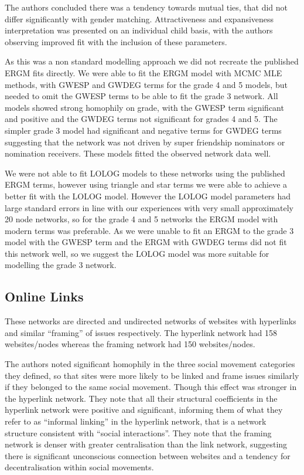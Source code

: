 \documentclass[
]{statsoc}
\begin{document}
The authors concluded there was a tendency towards mutual ties, that did
not differ significantly with gender matching. Attractiveness and
expansiveness interpretation was presented on an individual child basis,
with the authors observing improved fit with the inclusion of these
parameters.

As this was a non standard modelling approach we did not recreate the
published ERGM fits directly. We were able to fit the ERGM model with
MCMC MLE methods, with GWESP and GWDEG terms for the grade 4 and 5
models, but needed to omit the GWESP terms to be able to fit the grade 3
network. All models showed strong homophily on grade, with the GWESP
term significant and positive and the GWDEG terms not significant for
grades 4 and 5. The simpler grade 3 model had significant and negative
terms for GWDEG terms suggesting that the network was not driven by
super friendship nominators or nomination receivers. These models fitted
the observed network data well.

We were not able to fit LOLOG models to these networks using the
published ERGM terms, however using triangle and star terms we were able
to achieve a better fit with the LOLOG model. However the LOLOG model
parameters had large standard errors in line with our experiences with
very small approximately 20 node networks, so for the grade 4 and 5
networks the ERGM model with modern terms was preferable. As we were
unable to fit an ERGM to the grade 3 model with the GWESP term and the
ERGM with GWDEG terms did not fit this network well, so we suggest the
LOLOG model was more suitable for modelling the grade 3 network.

\subsection{Online Links}

These networks are directed and undirected networks of websites with
hyperlinks and similar ``framing'' of issues respectively. The hyperlink
network had 158 websites/nodes whereas the framing network had 150
websites/nodes.

The authors noted significant homophily in the three social movement
categories they defined, so that sites were more likely to be linked and
frame issues similarly if they belonged to the same social movement.
Though this effect was stronger in the hyperlink network. They note that
all their structural coefficients in the hyperlink network were positive
and significant, informing them of what they refer to as ``informal
linking'' in the hyperlink network, that is a network structure
consistent with ``social interactions''. They note that the framing
network is denser with greater centralisation than the link network,
suggesting there is significant unconscious connection between websites
and a tendency for decentralisation within social movements.
\end{document}

